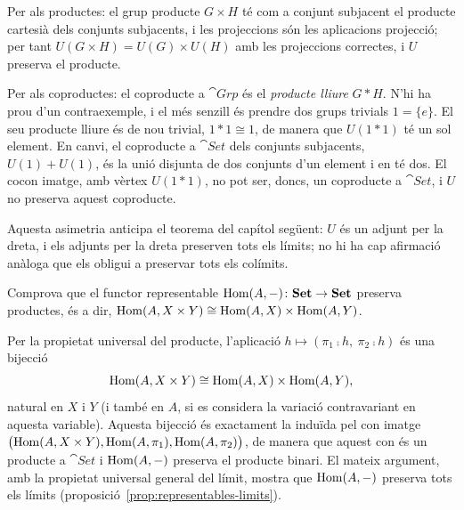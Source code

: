 \begin{solucio}
Per als productes: el grup producte $G\times H$ té com a conjunt subjacent el producte cartesià dels conjunts subjacents, i les projeccions són les aplicacions projecció; per tant $U(G\times H)=U(G)\times U(H)$ amb les projeccions correctes, i $U$ preserva el producte.

Per als coproductes: el coproducte a $\cat{Grp}$ és el \emph{producte lliure} $G*H$. N'hi ha prou d'un contraexemple, i el més senzill és prendre dos grups trivials $1=\{e\}$. El seu producte lliure és de nou trivial, $1*1\cong 1$, de manera que $U(1*1)$ té un sol element. En canvi, el coproducte a $\cat{Set}$ dels conjunts subjacents, $U(1)+U(1)$, és la unió disjunta de dos conjunts d'un element i en té dos. El cocon imatge, amb vèrtex $U(1*1)$, no pot ser, doncs, un coproducte a $\cat{Set}$, i $U$ no preserva aquest coproducte.

Aquesta asimetria anticipa el teorema del capítol següent: $U$ és un adjunt per la dreta, i els adjunts per la dreta preserven tots els límits; no hi ha cap afirmació anàloga que els obligui a preservar tots els colímits.
\end{solucio}

\begin{exercici}
Comprova que el functor representable $\operatorname{Hom}(A,-)\colon\mathbf{Set}\to\mathbf{Set}$ preserva productes, és a dir, $\operatorname{Hom}(A,X\times Y)\cong\operatorname{Hom}(A,X)\times\operatorname{Hom}(A,Y)$.
\end{exercici}

\begin{solucio}
Per la propietat universal del producte, l'aplicació $h\mapsto(\pi_1\comp h,\ \pi_2\comp h)$ és una bijecció
\[
\operatorname{Hom}(A,X\times Y)\cong\operatorname{Hom}(A,X)\times\operatorname{Hom}(A,Y),
\]
natural en $X$ i $Y$ (i també en $A$, si es considera la variació contravariant en aquesta variable). Aquesta bijecció és exactament la induïda pel con imatge $\bigl(\operatorname{Hom}(A,X\times Y),\operatorname{Hom}(A,\pi_1),\operatorname{Hom}(A,\pi_2)\bigr)$, de manera que aquest con és un producte a $\cat{Set}$ i $\operatorname{Hom}(A,-)$ preserva el producte binari. El mateix argument, amb la propietat universal general del límit, mostra que $\operatorname{Hom}(A,-)$ preserva tots els límits (proposició~\ref{prop:representables-limits}).
\end{solucio}
